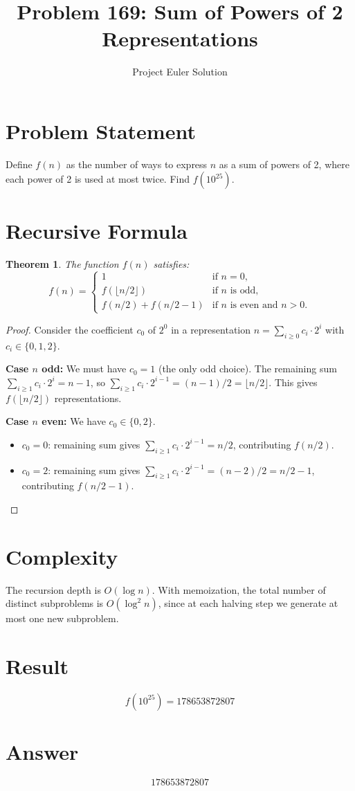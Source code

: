 \documentclass[11pt]{article}
\title{Problem 169: Sum of Powers of 2 Representations}
\author{Project Euler Solution}
\date{}
\newtheorem{theorem}{Theorem}
\theoremstyle{definition}
\begin{document}
\maketitle

\section{Problem Statement}
Define $f(n)$ as the number of ways to express $n$ as a sum of powers of 2, where each power of 2 is used at most twice. Find $f(10^{25})$.

\section{Recursive Formula}

\begin{theorem}
The function $f(n)$ satisfies:
\[
f(n) = \begin{cases}
1 & \text{if } n = 0, \\
f\!\left(\lfloor n/2 \rfloor\right) & \text{if } n \text{ is odd}, \\
f\!\left(n/2\right) + f\!\left(n/2 - 1\right) & \text{if } n \text{ is even and } n > 0.
\end{cases}
\]
\end{theorem}

\begin{proof}
Consider the coefficient $c_0$ of $2^0$ in a representation $n = \sum_{i \ge 0} c_i \cdot 2^i$ with $c_i \in \{0,1,2\}$.

\textbf{Case $n$ odd:} We must have $c_0 = 1$ (the only odd choice). The remaining sum $\sum_{i \ge 1} c_i \cdot 2^i = n - 1$, so $\sum_{i \ge 1} c_i \cdot 2^{i-1} = (n-1)/2 = \lfloor n/2 \rfloor$. This gives $f(\lfloor n/2 \rfloor)$ representations.

\textbf{Case $n$ even:} We have $c_0 \in \{0, 2\}$.
\begin{itemize}
    \item $c_0 = 0$: remaining sum gives $\sum_{i \ge 1} c_i \cdot 2^{i-1} = n/2$, contributing $f(n/2)$.
    \item $c_0 = 2$: remaining sum gives $\sum_{i \ge 1} c_i \cdot 2^{i-1} = (n-2)/2 = n/2 - 1$, contributing $f(n/2 - 1)$.
\end{itemize}
\end{proof}

\section{Complexity}
The recursion depth is $O(\log n)$. With memoization, the total number of distinct subproblems is $O(\log^2 n)$, since at each halving step we generate at most one new subproblem.

\section{Result}
\[
f(10^{25}) = \boxed{178653872807}
\]

\section{Answer}

\[
\boxed{178653872807}
\]
\end{document}
